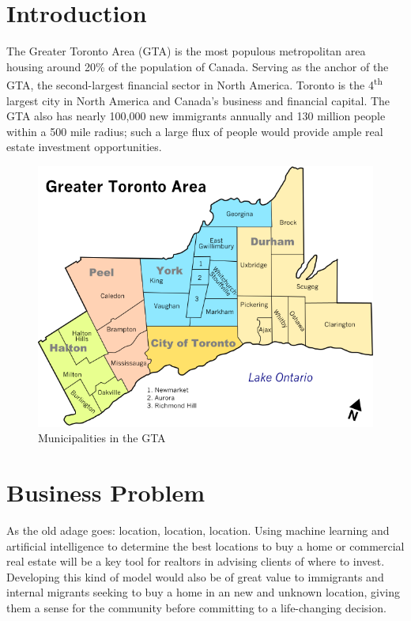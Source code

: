 \documentclass{article}
\begin{document}


\section{Introduction}

The Greater Toronto Area (GTA) is the most populous metropolitan area housing around 20\% of the population of Canada. Serving as the anchor of the GTA, the second-largest financial sector in North America. Toronto is the 4\textsuperscript{th} largest city in North America and Canada's business and financial capital. The GTA also has nearly 100,000 new immigrants annually and 130 million people within a 500 mile radius; such a large flux of people would provide ample real estate investment opportunities.   

\begin{figure}[h]
	\centering
	\includegraphics[width=\textwidth]{gta_map.png}
	\caption{Municipalities in the GTA}
	\label{gta}
\end{figure}


\section{Business Problem}

As the old adage goes: location, location, location. Using machine learning and artificial intelligence to determine the best locations to buy a home or commercial real estate will be a key tool for realtors in advising clients of where to invest. Developing this kind of model would also be of great value to immigrants and internal migrants seeking to buy a home in an new and unknown location, giving them a sense for the community before committing to a life-changing decision.
\end{document}

